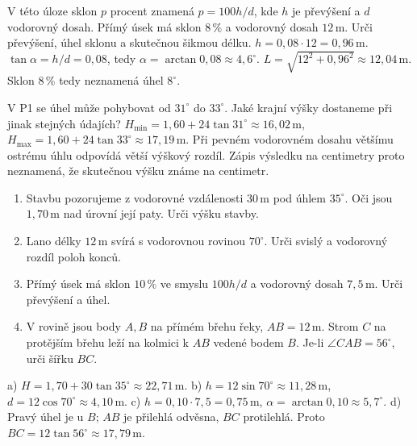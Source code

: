 \documentclass[11pt,a4paper]{article}
\begin{document}
\begin{zadaniReseniBox}[title={R1: sklon v procentech, 8–12 minut},breakable=false]
V této úloze sklon $p$ procent znamená $p=100h/d$,
kde $h$ je převýšení a $d$ vodorovný dosah.
Přímý úsek má sklon $8\,\%$ a vodorovný dosah $12\,\mathrm m$.
Urči převýšení, úhel sklonu a skutečnou šikmou délku.
\tcblower
$h=0{,}08\cdot12=0{,}96\,\mathrm m$.
$\tan\alpha=h/d=0{,}08$, tedy $\alpha=\arctan0{,}08\approx4{,}6^\circ$.
$L=\sqrt{12^2+0{,}96^2}\approx12{,}04\,\mathrm m$.
Sklon $8\,\%$ tedy neznamená úhel $8^\circ$.
\end{zadaniReseniBox}
\begin{zadaniReseniBox}[title={R2: citlivost měření, 5–8 minut},breakable=false]
V P1 se úhel může pohybovat od $31^\circ$ do $33^\circ$.
Jaké krajní výšky dostaneme při jinak stejných údajích?
\tcblower
$H_{\min}=1{,}60+24\tan31^\circ\approx16{,}02\,\mathrm m$,
$H_{\max}=1{,}60+24\tan33^\circ\approx17{,}19\,\mathrm m$.
Při pevném vodorovném dosahu většímu ostrému úhlu odpovídá větší výškový rozdíl.
Zápis výsledku na centimetry proto neznamená, že skutečnou výšku známe na centimetr.
\end{zadaniReseniBox}

\begin{zadaniReseniBox}[title={D1: 15–20 minut; každý model doplň náčrtem}]
\begin{enumerate}[label=\alph*)]
\item Stavbu pozorujeme z vodorovné vzdálenosti $30\,\mathrm m$ pod úhlem $35^\circ$.
Oči jsou $1{,}70\,\mathrm m$ nad úrovní její paty. Urči výšku stavby.
\item Lano délky $12\,\mathrm m$ svírá s vodorovnou rovinou $70^\circ$.
Urči svislý a vodorovný rozdíl poloh konců.
\item Přímý úsek má sklon $10\,\%$ ve smyslu $100h/d$
a vodorovný dosah $7{,}5\,\mathrm m$. Urči převýšení a úhel.
\item V rovině jsou body $A,B$ na přímém břehu řeky, $AB=12\,\mathrm m$.
Strom $C$ na protějším břehu leží na kolmici k $AB$ vedené bodem $B$.
Je-li $\angle CAB=56^\circ$, urči šířku $BC$.
\end{enumerate}
\tcblower
a) $H=1{,}70+30\tan35^\circ\approx22{,}71\,\mathrm m$.
b) $h=12\sin70^\circ\approx11{,}28\,\mathrm m$,
$d=12\cos70^\circ\approx4{,}10\,\mathrm m$.
c) $h=0{,}10\cdot7{,}5=0{,}75\,\mathrm m$,
$\alpha=\arctan0{,}10\approx5{,}7^\circ$.
d) Pravý úhel je u $B$; $AB$ je přilehlá odvěsna,
$BC$ protilehlá. Proto $BC=12\tan56^\circ\approx17{,}79\,\mathrm m$.
\end{zadaniReseniBox}
\end{document}

